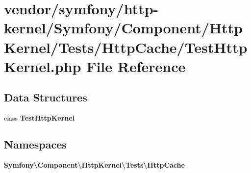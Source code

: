 \section{vendor/symfony/http-\/kernel/\+Symfony/\+Component/\+Http\+Kernel/\+Tests/\+Http\+Cache/\+Test\+Http\+Kernel.php File Reference}
\label{_http_cache_2_test_http_kernel_8php}
\subsection*{Data Structures}
\begin{DoxyCompactItemize}
\item 
class {\bf Test\+Http\+Kernel}
\end{DoxyCompactItemize}
\subsection*{Namespaces}
\begin{DoxyCompactItemize}
\item 
 {\bf Symfony\textbackslash{}\+Component\textbackslash{}\+Http\+Kernel\textbackslash{}\+Tests\textbackslash{}\+Http\+Cache}
\end{DoxyCompactItemize}
